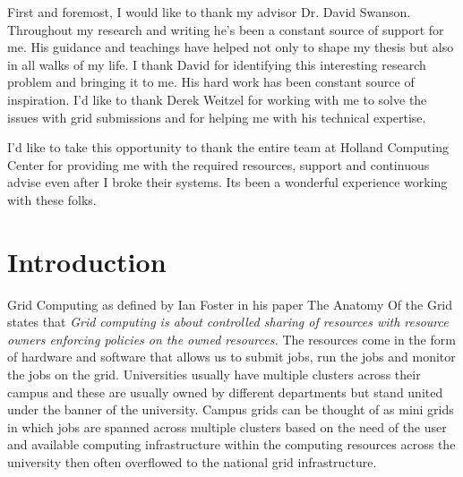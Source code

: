\documentclass[ms,electronic,double]{nuthesis}
\begin{document}

\begin{acknowledgments}

First and foremost, I would like to thank my advisor Dr. David Swanson. Throughout my research
and writing he's been a constant source of support for me. His guidance and teachings have helped not 
only to shape my thesis but also in all walks of my life. I thank David for identifying this interesting
research problem and bringing it to me. His hard work has been constant source of inspiration.
 I'd like to thank Derek Weitzel for working with me to solve the 
 issues with grid submissions and for helping me with his technical expertise.
 
 I'd like to take this opportunity to thank the entire team at Holland 
Computing Center for providing me with the required resources, support and continuous advise
 even after I broke their systems. Its been a wonderful experience 
 working with these folks.
 
\end{acknowledgments}

\tableofcontents
\newpage
\listoffigures
\listoftables


\mainmatter

\chapter{Introduction}
Grid Computing as defined by Ian Foster in his paper The Anatomy Of the Grid \cite{Foster:2001:AGE:1080644.1080667}
states that 
\emph{Grid computing is about controlled sharing of resources with resource owners enforcing policies 
on the owned resources.} The resources come in the form of hardware 
and software that allows us to submit jobs, run the jobs and monitor the jobs on the grid. 
Universities usually have multiple clusters across their campus and these are 
usually owned by different departments but stand united under the banner of the university.
Campus grids can be thought of as mini grids in which jobs are spanned across multiple clusters
 based on the need of the user and available computing infrastructure within the computing resources across the university then often overflowed to the national
grid infrastructure\cite{derekThesis}.
\end{document}
